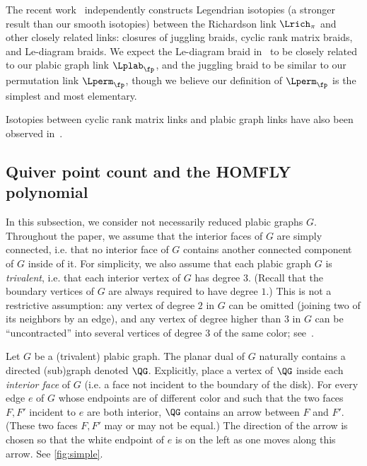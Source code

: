 %
%
%

%

%


\begin{remark}
The recent work~\cite{CGGS} independently constructs Legendrian isotopies (a stronger result than our smooth isotopies) between the Richardson link $\Lrich_\pi$ and other closely related links: closures of juggling braids, cyclic rank matrix braids, and Le-diagram braids.  We expect the Le-diagram braid in~\cite{CGGS} to be closely related to our plabic graph link $\Lplab_\fp$, and the juggling braid to be similar to our permutation link $\Lperm_\fp$, though we believe our definition of $\Lperm_\fp$ is the simplest and most elementary.

Isotopies between cyclic rank matrix links and plabic graph links have also been observed in~\cite{STWZ}.
%
%
\end{remark}

\subsection{Quiver point count and the HOMFLY polynomial}\label{sec:intro:quivers-point-count}
In this subsection, we consider not necessarily reduced plabic graphs $G$. Throughout the paper, we assume that the interior faces of $G$ are simply connected, i.e.  that no interior face of $G$ contains another connected component of $G$ inside of it. For simplicity, we also assume that each plabic graph $G$ is \emph{trivalent}, i.e.  that each interior vertex of $G$ has degree $3$. (Recall that the boundary vertices of $G$ are always required to have degree $1$.) This is not a restrictive assumption: any vertex of degree $2$ in $G$ can be omitted (joining two of its neighbors by an edge), and any vertex of degree higher than $3$ in $G$ can be ``uncontracted'' into several vertices of degree $3$ of the same color; see~\cite[Figure~12.2]{Pos}.
%
%
%
%

Let $G$ be a (trivalent) plabic graph. The planar dual of $G$ naturally contains a directed (sub)graph denoted $\QG$. Explicitly, place a vertex of $\QG$ inside each \emph{interior face} of $G$ (i.e.  a face not incident to the boundary of the disk). For every edge $e$ of $G$ whose endpoints are of different color and such that the two faces $F,F'$ incident to $e$ are both interior, $\QG$ contains an arrow between $F$ and $F'$. (These two faces $F,F'$ may or may not be equal.) The direction of the arrow is chosen so that the white endpoint of $e$ is on the left as one moves along this arrow. See \cref{fig:simple}.


